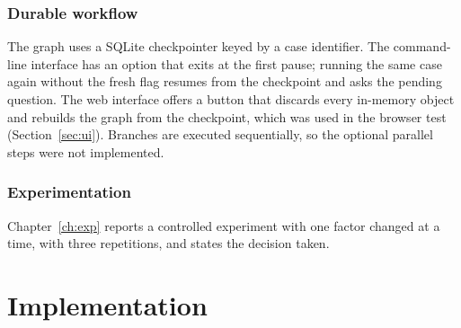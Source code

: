 \documentclass[12pt,a4paper,oneside]{report}
\begin{document}
\subsection{Durable workflow}\label{sec:durable}
The graph uses a SQLite checkpointer keyed by a case identifier. The command-line interface has an option that exits at the first pause; running the same case again without the fresh flag resumes from the checkpoint and asks the pending question. The web interface offers a button that discards every in-memory object and rebuilds the graph from the checkpoint, which was used in the browser test (Section~\ref{sec:ui}). Branches are executed sequentially, so the optional parallel steps were not implemented.

\subsection{Experimentation}
Chapter~\ref{ch:exp} reports a controlled experiment with one factor changed at a time, with three repetitions, and states the decision taken.

\chapter{Implementation}\label{ch:impl}
\end{document}
